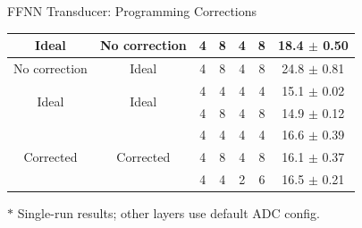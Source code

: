 \documentclass[xcolor=table,mathserif,9pt,usepdftitle=false]{beamer}    %
\newcommand{\werstdpad}{}
\newcommand{\werresult}[2]{\ifdim #1pt<10pt\phantom{0}\fi#1 $\pm$ \ifdim #2pt<10pt\werstdpad\fi#2\phantom{${}^{*}$}}
\newcommand{\adctablenotes}{%
  \begin{tablenotes}[flushleft]\footnotesize
    \item[] $*$ Single-run results; other layers use default ADC config.
  \end{tablenotes}}
\begin{document}
\begin{frame}{FFNN Transducer: Programming Corrections}
\begin{table}
\begin{threeparttable}
\begin{tabular}{|c|c|c|c|c|c||c|}
        \hline\hline
        Ideal                                                                    & No correction                                              & 4                                 & 8 & 4 & 8 & \werresult{18.4}{0.50} \\
        \hline
        No correction                                                            & Ideal                                                      & 4                                 & 8 & 4 & 8 & \werresult{24.8}{0.81} \\
        \hline\hline
        \multirow{2}{*}{Ideal}                                                   & \multirow{2}{*}{Ideal}                                     & 4                                 & 4 & 4 & 4 & \werresult{15.1}{0.02} \\
        \cline{3-7}
                                                                                 &                                                            & 4                                 & 8 & 4 & 8 & \werresult{14.9}{0.12} \\
        \hline\hline
        \multirow{3}{*}{Corrected}                                               & \multirow{3}{*}{Corrected}                                 & 4                                 & 4 & 4 & 4 & \werresult{16.6}{0.39} \\
        \cline{3-7}
                                                                                 &                                                            & 4                                 & 8 & 4 & 8 & \werresult{16.1}{0.37} \\
        \cline{3-7}
                                                                                 &                                                            & 4                                 & 4 & 2 & 6 & \werresult{16.5}{0.21} \\
        \hline
      \end{tabular}
      \adctablenotes
    \end{threeparttable}
  \end{table}
\end{frame}
\end{document}
